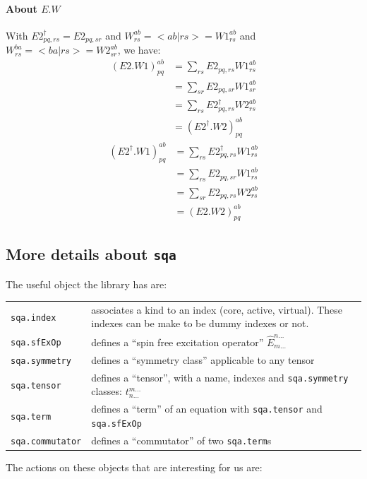 \documentclass{article}
\newcommand  \equ[2]       {\begin{align}#2\label{#1}\end{align}}
\newcommand  \var[1]       {\texttt{#1}}
\newcommand  \E[2]         {\hat{E}_{#1}^{#2}}
\begin{document}
\paragraph{About $E.W$}

With $E2^\dagger_{pq,rs}=E2_{pq,sr}$ and $W^{ab}_{rs}=<ab|rs>=W1^{ab}_{rs}$ and $W^{ba}_{rs}=<ba|rs>=W2^{ab}_{sr}$, we have:
\equ{ }{
  (E2.W1)^{ab}_{pq}
  & =\sum_{rs} E2_{pq,rs} W1^{ab}_{rs}
 \nonumber\\
 & =\sum_{sr} E2_{pq,sr} W1^{ab}_{sr}
 \nonumber\\
 & =\sum_{rs} E2^\dagger_{pq,rs} W2^{ab}_{rs}
 \nonumber\\
 & =(E2^\dagger.W2)^{ab}_{pq}
}
\equ{ }{
  (E2^\dagger.W1)^{ab}_{pq}
  & =\sum_{rs} E2^\dagger_{pq,rs} W1^{ab}_{rs}
 \nonumber\\
 & =\sum_{rs} E2_{pq,sr} W1^{ab}_{rs}
 \nonumber\\
 & =\sum_{sr} E2_{pq,rs} W2^{ab}_{rs}
 \nonumber\\
 & =(E2.W2)^{ab}_{pq}
}

\subsection{More details about \var{sqa}}

The useful object the library has are:

\noindent
\begin{tabularx}{\linewidth}{lX}
  \var{sqa.index}      & associates a kind to an index (core, active, virtual).
                         These indexes can be make to be dummy indexes or not.\\
  \var{sqa.sfExOp}     & defines a ``spin free excitation operator'' $\E{m\dots}{n\dots}$ \\
  \var{sqa.symmetry}   & defines a ``symmetry class'' applicable to any tensor  \\
  \var{sqa.tensor}     & defines a ``tensor'', with a name, indexes and \var{sqa.symmetry} classes: $t^{m\dots}_{n\dots}$  \\
  \var{sqa.term}       & defines a ``term'' of an equation with \var{sqa.tensor} and \var{sqa.sfExOp} \\
  \var{sqa.commutator} & defines a ``commutator'' of two \var{sqa.term}s  \\
\end{tabularx}

\vspace{.5cm}
\noindent
The actions on these objects that are interesting for us are:
\end{document}
